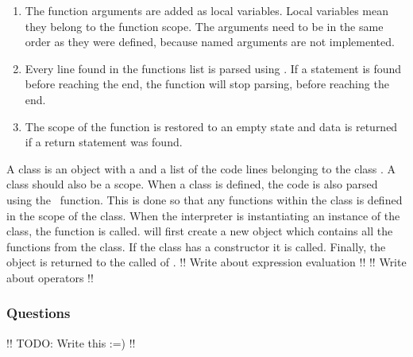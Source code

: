 \begin{enumerate}
    \item The function arguments are added as local variables. Local variables mean they belong to the function scope. The arguments need to be in the same order as they were defined, because named arguments are not implemented.
    \item Every line found in the functions  list is parsed using . If a  statement is found before reaching the end, the function will stop parsing, before reaching the end.
    \item The scope of the function is restored to an empty state and data is returned if a return statement was found.
\end{enumerate}
A class is an object with a  and a list of the code lines belonging to the class . A class should also be a scope. When a class is defined, the code is also parsed using the  function. This is done so that any functions within the class is defined in the scope of the class. When the interpreter is instantiating an instance of the class, the  function is called.  will first create a new object which contains all the functions from the class. If the class has a constructor it is called. Finally, the object is returned to the called of .
!! Write about expression evaluation !!
!! Write about operators !!

\subsubsection{Questions}
!! TODO: Write this :=) !!